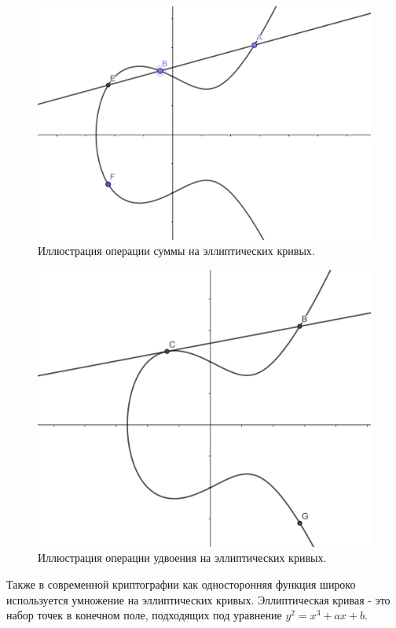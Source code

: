 \documentclass[times,specification,annotation]{itmo-student-thesis}
\begin{document}
\begin{figure}[!h]
\caption{Иллюстрация операции суммы на эллиптических кривых.}\label{fig:ec_sum}
\includegraphics[width=15cm]{graphics/ec_summation.png}
\end{figure}
\begin{figure}[!h]
\caption{Иллюстрация операции удвоения на эллиптических кривых.}\label{fig:ec_doub}
\includegraphics[width=15cm]{graphics/ec_doubling.png}
\end{figure}
Также в современной криптографии как односторонняя функция широко используется умножение на эллиптических кривых.
Эллиптическая кривая - это набор точек в конечном поле, подходящих под уравнение $y^2=x^3+ax+b$.
\end{document}
